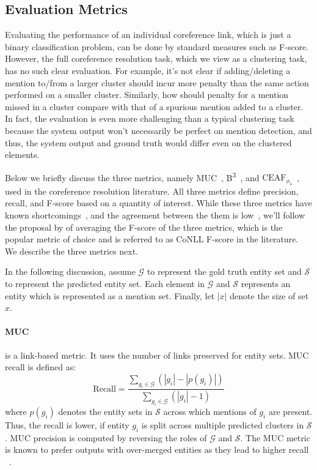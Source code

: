 \documentclass[12pt]{thesis-umich}[thesis]
\begin{document}
\subsection{Evaluation Metrics}
Evaluating the performance of an individual coreference link, which is just a binary classification problem, can be done by standard measures such as F-score. However, the full coreference resolution task, which we view as a clustering task, has no such clear evaluation. 
For example, it's not clear if adding/deleting a mention to/from a larger cluster should incur more penalty than the same action performed on a smaller cluster. Similarly,  how should penalty for a mention missed in a cluster compare with that of a spurious mention added to a cluster. 
In fact, the evaluation is even more challenging than a typical clustering task because the system output won't necessarily be perfect on mention detection, and thus, the system output and ground truth would differ even on the clustered elements.


Below we briefly discuss the three metrics, namely MUC~\citep{vilain-etal-1995-model}, B\textsuperscript{3}~\citep{Bagga98algorithmsfor}, and $\text{CEAF}_{\phi_4}$~\citep{luo-2005-coreference},  used in the coreference resolution literature. All three metrics define precision, recall, and F-score based on a quantity of interest. 
While these three metrics have known shortcomings~\citep{Bagga98algorithmsfor, luo-2005-coreference,  moosavi-strube-2016-coreference}, and the agreement between the them is low~\citep{holen-2013-critical}, we'll follow the proposal by \citet{denis09global}  of averaging the F-score of the three metrics, which is the popular metric of choice and is referred to as CoNLL F-score in the literature. We describe the three metrics next.

In the following discussion, assume $\mathcal{G}$ to represent the gold truth entity set and $\mathcal{S}$ to represent the predicted entity set. Each element in $\mathcal{G}$ and $\mathcal{S}$ represents an entity which is represented as a mention set. Finally, let $|x|$ denote the size of set $x$. 

\paragraph{MUC} is a link-based metric. It uses the number of links preserved for entity sets. MUC recall is defined as:
$$\textrm{Recall} = \frac{\sum_{g_i \in \mathcal{G}} (|g_i| - |p(g_i)|)}{\sum_{g_i \in \mathcal{G}} (|g_i| -1 )}$$
where $p(g_i)$ denotes the entity sets in $\mathcal{S}$ across which mentions of $g_i$ are present. Thus, the recall is lower, if entity $g_i$ is split across multiple predicted clusters in $\mathcal{S}$. 
MUC precision is computed by reversing the roles of $\mathcal{G}$ and $\mathcal{S}$. 
The MUC metric is known to prefer outputs with over-merged entities as they lead to higher recall ~\cite{luo-2005-coreference}.  
\end{document}
